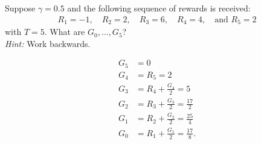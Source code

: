 
\begin{exercise}[Exercise 3.8]

Suppose $\gamma = 0.5$ and the following sequence of rewards is received:
\begin{align*}
  R_1 = -1, \quad R_2 = 2, \quad R_3 = 6, \quad R_4 = 4, \quad \text{and } R_5 = 2
\end{align*}
with $T = 5$. What are $G_0, \dots, G_5$? \\
\textit{Hint:} Work backwards.

\end{exercise}


\begin{solution}

\begin{align*}
  G_5 &= 0 \\
  G_4 &= R_5 = 2 \\
  G_3 &= R_4 + \frac{G_4}{2} = 5 \\
  G_2 &= R_3 + \frac{G_3}{2} = \frac{17}{2} \\
  G_1 &= R_2 + \frac{G_2}{2} = \frac{25}{4} \\
  G_0 &= R_1 + \frac{G_1}{2} = \frac{17}{8}.
\end{align*}

\end{solution}

